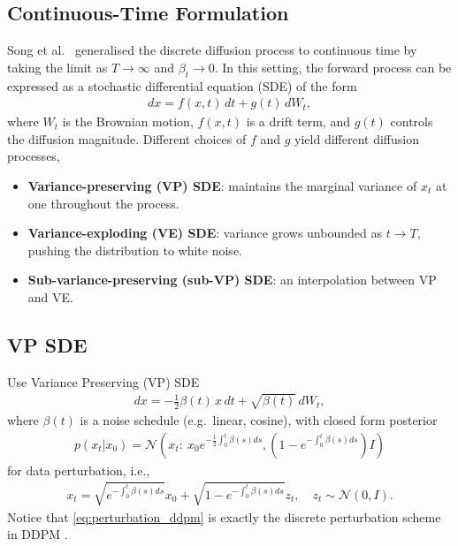 \documentclass[12pt]{report}
\begin{document}
\subsection{Continuous-Time Formulation}
Song et al.~\cite{song2020score} generalised the discrete diffusion process to continuous time by taking the limit as \(T \to \infty\) and \(\beta_t \to 0\). In this setting, the forward process can be expressed as a stochastic differential equation (SDE) of the form
\begin{align}\label{eq:forward_sde}
    dx = f(x,t)\,dt + g(t)\,dW_t,
\end{align}
where \(W_t\) is the Brownian motion, \(f(x,t)\) is a drift term, and \(g(t)\) controls the diffusion magnitude. Different choices of \(f\) and \(g\) yield different diffusion processes,
\begin{itemize}
    \item \textbf{Variance-preserving (VP) SDE}: maintains the marginal variance of $x_t$ at one throughout the process.  
    \item \textbf{Variance-exploding (VE) SDE}: variance grows unbounded as $t \to T$, pushing the distribution to white noise.  
    \item \textbf{Sub-variance-preserving (sub-VP) SDE}: an interpolation between VP and VE.  
\end{itemize}
\subsection{VP SDE}
Use Variance Preserving (VP) SDE \cite{song2020score}
\begin{align}\label{eq:VPSDE}
    dx = -\frac{1}{2}\beta(t)\,x\,dt + \sqrt{\beta(t)}\,dW_t,
\end{align}
where $\beta(t)$ is a noise schedule (e.g.~linear, cosine), with closed form posterior
\begin{align*}
    p\left(x_t|x_0\right)=\mathcal{N}\left(x_t:\:x_0e^{-\frac{1}{2}\int_0^t\beta(s)ds},\left(1-e^{-\int_0^t\beta(s)ds}\right)I\right)
\end{align*}
for data perturbation, i.e.,
\begin{align}\label{eq:perturbation_ddpm}
    x_t=\sqrt{e^{-\int_0^t\beta(s)ds}}x_0+\sqrt{1-e^{-\int_0^t\beta(s)ds}}z_t,\quad z_t\sim\mathcal{N}\left(0, I\right).
\end{align}
Notice that \cref{eq:perturbation_ddpm} is exactly the discrete perturbation scheme in DDPM \cite{hoDenoisingDiffusionProbabilistic2020}.
\end{document}

